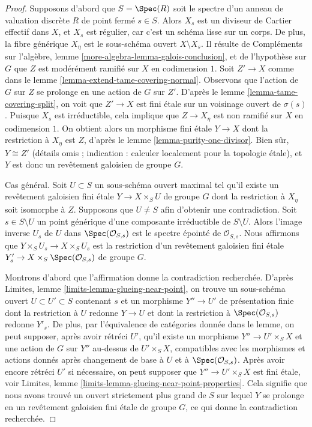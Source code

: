\begin{proof}
Supposons d'abord que $S = \Spec(R)$ soit le spectre d'un anneau de valuation discrète $R$
de point fermé $s \in S$. Alors $X_s$ est un diviseur de Cartier effectif
dans $X$, et $X_s$ est régulier, car c'est un schéma lisse sur un corps.
De plus, la fibre générique $X_\eta$ est le sous-schéma ouvert $X \setminus X_s$.
Il résulte de
Compléments sur l'algèbre, lemme \ref{more-algebra-lemma-galois-conclusion},
et de l'hypothèse sur $G$ que $Z$ est modérément ramifié
sur $X$ en codimension $1$. Soit $Z' \to X$ comme dans le
lemme \ref{lemma-extend-tame-covering-normal}. Observons que
l'action de $G$ sur $Z$ se prolonge en une action de $G$ sur $Z'$.
D'après le lemme \ref{lemma-tame-covering-split},
on voit que $Z' \to X$ est fini \'etale sur un voisinage
ouvert de $\sigma(s)$.
Puisque $X_s$ est irréductible, cela implique que $Z \to X_\eta$
est non ramifié sur $X$ en codimension $1$.
On obtient alors un morphisme fini \'etale $Y \to X$
dont la restriction à $X_\eta$ est $Z$, d'après le
lemme \ref{lemma-purity-one-divisor}.
Bien sûr, $Y \cong Z'$ (détails omis ; indication : calculer localement pour la topologie \'etale),
et $Y$ est donc un revêtement galoisien de groupe $G$.

\medskip\noindent
Cas général. Soit $U \subset S$ un sous-schéma ouvert maximal
tel qu'il existe un revêtement galoisien fini \'etale
$Y \to X \times_S U$ de groupe $G$
dont la restriction à $X_\eta$ soit isomorphe à $Z$.
Supposons que $U \not = S$ afin d'obtenir une contradiction.
Soit $s \in S \setminus U$ un point générique d'une composante irréductible
de $S \setminus U$. Alors l'image inverse $U_s$
de $U$ dans $\Spec(\mathcal{O}_{S, s})$
est le spectre épointé de $\mathcal{O}_{S, s}$.
Nous affirmons que $Y \times_S U_s \to X \times_S U_s$
est la restriction d'un revêtement galoisien fini \'etale
$Y'_s \to X \times_S \Spec(\mathcal{O}_{S, s})$
de groupe $G$.

\medskip\noindent
Montrons d'abord que l'affirmation donne la contradiction recherchée.
D'après Limites, lemme \ref{limits-lemma-glueing-near-point},
on trouve un sous-schéma ouvert $U \subset U' \subset S$
contenant $s$ et un morphisme $Y'' \to U'$ de présentation finie
dont la restriction à $U$ redonne $Y \to U$ et
dont la restriction à $\Spec(\mathcal{O}_{S, s})$ redonne $Y'_s$.
De plus, par l'équivalence de catégories donnée dans le
lemme, on peut supposer, après avoir rétréci $U'$,
qu'il existe un morphisme $Y'' \to U' \times_S X$
et une action de $G$ sur $Y''$ au-dessus de $U' \times_S X$,
compatibles avec les morphismes et actions donnés après
changement de base à $U$ et à $\Spec(\mathcal{O}_{S, s})$.
Après avoir encore rétréci $U'$ si nécessaire, on peut
supposer que $Y'' \to U' \times_S X$ est fini \'etale, voir
Limites, lemme \ref{limits-lemma-glueing-near-point-properties}.
Cela signifie que nous avons trouvé un ouvert strictement plus grand de $S$ sur lequel
$Y$ se prolonge en un revêtement galoisien fini \'etale de groupe $G$,
ce qui donne la contradiction recherchée.


\end{proof}
